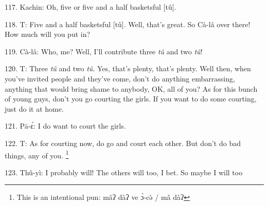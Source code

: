 117. Kachin: Oh, five or five and a half basketsful [tû].

118. T: Five and a half basketsful [tû].  Well, that's great.  So Cà-lâ over
there!  How much will you put in?

119. Cà-lâ: Who, me?  Well, I'll contribute three \textit{tû }and two \textit{tû}!

120. T: Three \textit{tû }and two \textit{tû}.  Yes, that's plenty, that's plenty.
Well then, when you've invited people and they've come, don't do anything embarrassing,
anything that would bring shame to anybody, OK, all of you?  As for this bunch
of young guys, don't you go courting the girls.  If you want to do some courting,
just do it at home.

121. Pā-ɛ́: I do want to court the girls.

122. T: As for courting now, do go and court each other.  But don't do bad things,
any of you. \footnote{This is an intentional pun: mâʔ   dàʔ   ve  ɔ̀-cə̀ /   mâ  dàʔ}

123. Thû-yì: I probably will!  The others will too, I bet.  So maybe I will too
